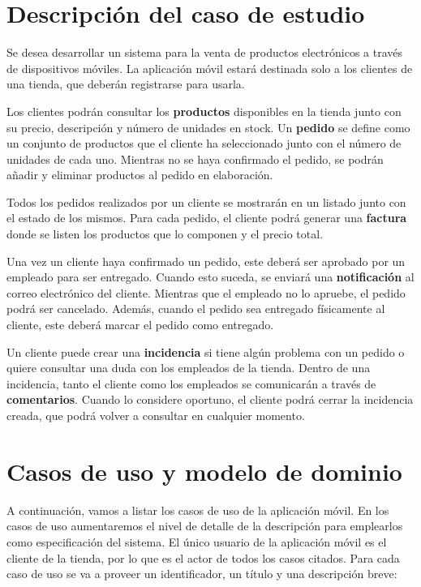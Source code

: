 \documentclass[11pt,spanish,listoffigures]{tfgetsinf}
\begin{document}
\section{Descripción del caso de estudio}

Se desea desarrollar un sistema para la venta de productos electrónicos a través de dispositivos móviles. La aplicación móvil estará destinada solo a los clientes de una tienda, que deberán registrarse para usarla.

Los clientes podrán consultar los \textbf{productos} disponibles en la tienda junto con su precio, descripción y número de unidades en stock. Un \textbf{pedido} se define como un conjunto de productos que el cliente ha seleccionado junto con el número de unidades de cada uno. Mientras no se haya confirmado el pedido, se podrán añadir y eliminar productos al pedido en elaboración.

Todos los pedidos realizados por un cliente se mostrarán en un listado junto con el estado de los mismos. Para cada pedido, el cliente podrá generar una \textbf{factura} donde se listen los productos que lo componen y el precio total.

Una vez un cliente haya confirmado un pedido, este deberá ser aprobado por un empleado para ser entregado. Cuando esto suceda, se enviará una \textbf{notificación} al correo electrónico del cliente. Mientras que el empleado no lo apruebe, el pedido podrá ser cancelado. Además, cuando el pedido sea entregado físicamente al cliente, este deberá marcar el pedido como entregado.

Un cliente puede crear una \textbf{incidencia} si tiene algún problema con un pedido o quiere consultar una duda con los empleados de la tienda. Dentro de una incidencia, tanto el cliente como los empleados se comunicarán a través de \textbf{comentarios}. Cuando lo considere oportuno, el cliente podrá cerrar la incidencia creada, que podrá volver a consultar en cualquier momento.

\section{Casos de uso y modelo de dominio} \label{sect:CUs}

A continuación, vamos a listar los casos de uso de la aplicación móvil. En los casos de uso aumentaremos el nivel de detalle de la descripción para emplearlos como especificación del sistema. El único usuario de la aplicación móvil es el cliente de la tienda, por lo que es el actor de todos los casos citados. Para cada caso de uso se va a proveer un identificador, un título y una descripción breve:
\end{document}
